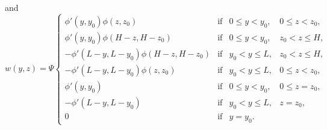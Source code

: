 and
\begin{equation} \label{eq:w_overturner}
	w(y,z) = \Psi\left\{ 
		\begin{array}{lrrr}
			\phi'(y,y_0)\phi(z,z_0) & \mbox{if} & 0 \le y < y_0, & 0 \le z < z_0,\\
			\phi'(y,y_0)\phi(H-z,H-z_0) & \mbox{if} & 0 \le y < y_0, & z_0 < z \le H,\\
			- \phi'(L-y,L-y_0)\phi(H-z,H-z_0) & \mbox{if} & y_0 < y \le L, & z_0 < z \le H,\\
			- \phi'(L-y,L-y_0)\phi(z,z_0) & \mbox{if} & y_0 < y \le L, & 0 \le z < z_0,\\
			\phi'(y,y_0) & \mbox{if} & 0 \le y < y_0, & 0 \le z = z_0,\\
			- \phi'(L-y,L-y_0) & \mbox{if} & y_0 < y \le L, & z = z_0,\\
			0 & \mbox{if} & y = y_0. &
		\end{array}
	\right.
\end{equation}